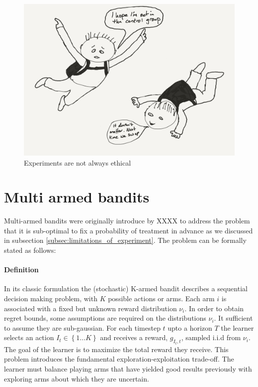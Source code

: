 \documentclass[11pt,a4paper,oneside]{book}
\newcommand{\set}[1]{\left\{#1\right\}}
\begin{document}
\begin{figure}[h]
\begin{center}
\caption{Experiments are not always ethical}
\includegraphics[scale=.4]{double_blind_parashute_trial_cartoon.png}
\end{center}
\end{figure}

\section*{Multi armed bandits}

Multi-armed bandits were originally introduce by XXXX to address the problem that it is sub-optimal to fix a probability of treatment in advance as we discussed in subsection \ref{subsec:limitations_of_experiment}. The problem can be formally stated as follows:

\paragraph*{Definition} 
In its classic formulation \cite{Robbins1952} the (stochastic) K-armed bandit describes a sequential decision making problem, with $K$ possible actions or arms. Each arm $i$ is associated with a fixed but unknown reward distribution $\nu_i$. In order to obtain regret bounds, some assumptions are required on the distributions $\nu_i$. It sufficient to assume they are sub-gaussian.  For each timestep $t$ upto a horizon $T$ the learner selects an action $I_t \in \set{1...K}$ and receives a reward, $g_{I_t,t}$, sampled i.i.d from $\nu_i$. The goal of the learner is to maximize the total reward they receive. This problem introduces the fundamental exploration-exploitation trade-off. The learner must balance playing arms that have yielded good results previously with exploring arms about which they are uncertain. 
\end{document}
